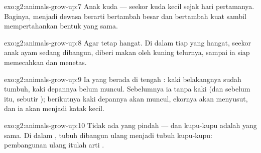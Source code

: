 \begin{solution}{exo:g2:animals-grow-up:7}
Anak kuda --- seekor kuda kecil sejak hari pertamanya. Baginya,
menjadi dewasa berarti bertambah besar dan bertambah kuat sambil
mempertahankan bentuk yang sama.
\end{solution}

\begin{solution}{exo:g2:animals-grow-up:8}
Agar tetap hangat. Di dalam tiap  yang hangat, seekor anak ayam
sedang dibangun, diberi makan oleh kuning telurnya, sampai ia siap
memecahkan  dan menetas.
\end{solution}

\begin{solution}{exo:g2:animals-grow-up:9}
Ia  yang berada di tengah : kaki belakangnya sudah
tumbuh, kaki depannya belum muncul. Sebelumnya ia  tanpa kaki
(dan sebelum itu, sebutir ); berikutnya kaki depannya akan
muncul, ekornya akan menyusut, dan ia akan menjadi katak kecil.
\end{solution}

\begin{solution}{exo:g2:animals-grow-up:10}
Tidak ada yang pindah ---  dan kupu-kupu adalah  yang sama.
Di dalam , tubuh  dibangun ulang menjadi tubuh
kupu-kupu: pembangunan ulang itulah arti .
\end{solution}
